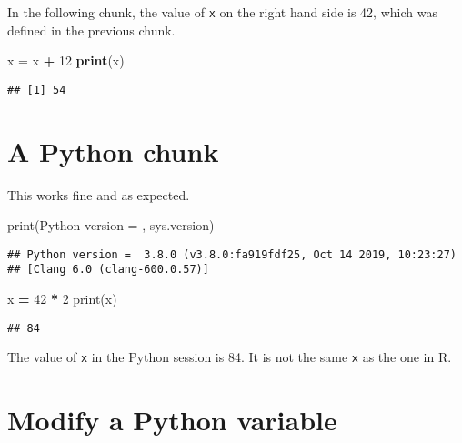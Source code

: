 \documentclass[
]{book}
\newenvironment{Shaded}{\begin{snugshade}}{\end{snugshade}}
\newcommand{\BuiltInTok}[1]{#1}
\newcommand{\DecValTok}[1]{\textcolor[rgb]{0.00,0.00,0.81}{#1}}
\newcommand{\KeywordTok}[1]{\textcolor[rgb]{0.13,0.29,0.53}{\textbf{#1}}}
\newcommand{\NormalTok}[1]{#1}
\newcommand{\OperatorTok}[1]{\textcolor[rgb]{0.81,0.36,0.00}{\textbf{#1}}}
\newcommand{\StringTok}[1]{\textcolor[rgb]{0.31,0.60,0.02}{#1}}
\begin{document}
In the following chunk, the value of \texttt{x} on the right hand side
is 42, which was defined in the previous chunk.

\begin{Shaded}
\begin{Highlighting}[]
\NormalTok{x =}\StringTok{ }\NormalTok{x }\OperatorTok{+}\StringTok{ }\DecValTok{12}
\KeywordTok{print}\NormalTok{(x)}
\end{Highlighting}
\end{Shaded}

\begin{verbatim}
## [1] 54
\end{verbatim}

\hypertarget{a-python-chunk}{%
\section{A Python chunk}\label{a-python-chunk}}

This works fine and as expected.

\begin{Shaded}
\begin{Highlighting}[]
\BuiltInTok{print}\NormalTok{(}\StringTok{\textquotesingle{}Python version = \textquotesingle{}}\NormalTok{, sys.version)}
\end{Highlighting}
\end{Shaded}

\begin{verbatim}
## Python version =  3.8.0 (v3.8.0:fa919fdf25, Oct 14 2019, 10:23:27) 
## [Clang 6.0 (clang-600.0.57)]
\end{verbatim}

\begin{Shaded}
\begin{Highlighting}[]
\NormalTok{x }\OperatorTok{=} \DecValTok{42} \OperatorTok{*} \DecValTok{2}
\BuiltInTok{print}\NormalTok{(x) }
\end{Highlighting}
\end{Shaded}

\begin{verbatim}
## 84
\end{verbatim}

The value of \texttt{x} in the Python session is 84.
It is not the same \texttt{x} as the one in R.

\hypertarget{modify-a-python-variable}{%
\section{Modify a Python variable}\label{modify-a-python-variable}}
\end{document}
